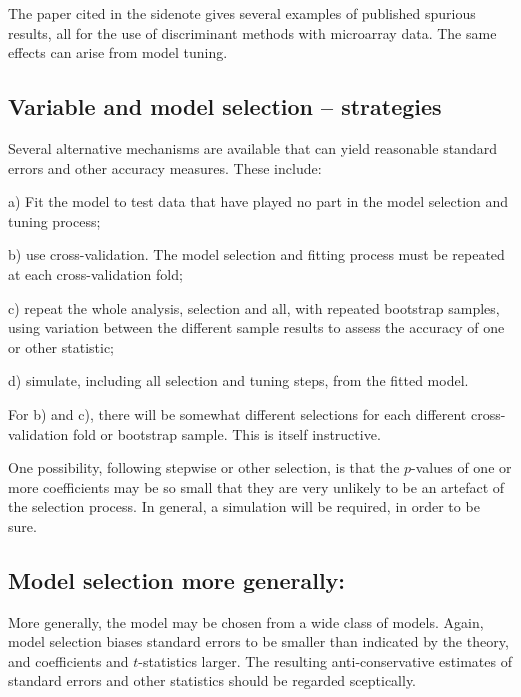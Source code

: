 The paper cited in the sidenote gives
several examples of published spurious results, all for the use of
discriminant methods with microarray data.  The same effects can arise
from model tuning.

\subsection{Variable and model selection -- strategies}

Several alternative mechanisms are available that can yield reasonable
standard errors and other accuracy measures. These include:
\begin{itemizz}
\item[a)] Fit the model to test data that have played no part in
the model selection and tuning process;
\item[b)] use cross-validation.  The model selection and fitting
process must be repeated at each cross-validation fold;
\item[c)] repeat the whole analysis, selection and all, with repeated
 bootstrap samples, using variation between the different sample
results to assess the accuracy of one or other statistic;
\item[d)] simulate, including all selection and tuning steps, from the
  fitted model.
\end{itemizz}
For b) and c), there will be somewhat different selections for each
different cross-validation fold or bootstrap sample.  This is itself
instructive.

One possibility,
following stepwise or other selection, is that the
$p$-values of one or more coefficients may be so small that they are
very unlikely to be an artefact of the selection process.  In general,
a simulation will be required, in order to be sure.

\subsection*{Model selection more generally:}

More generally, 
the model may be chosen from a wide class of models.
Again, model selection biases standard errors to be smaller than
indicated by the theory, and coefficients and $t$-statistics larger.
The resulting anti-conservative estimates of standard errors and
other statistics should be regarded
sceptically. 

